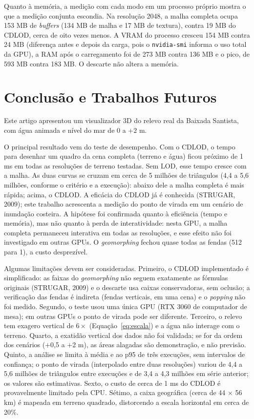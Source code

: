 \documentclass[conference]{IEEEtran}
\begin{document}
Quanto à memória, a medição com cada modo em um processo próprio mostra o que a medição conjunta escondia. Na resolução 2048, a malha completa ocupa 153 MB de \emph{buffers} (134 MB de malha e 17 MB de textura), contra 19 MB do CDLOD, cerca de oito vezes menos. A VRAM do processo cresceu 154 MB contra 24 MB (diferença antes e depois da carga, pois o \texttt{nvidia-smi} informa o uso total da GPU), a RAM após o carregamento foi de 273 MB contra 136 MB e o pico, de 593 MB contra 183 MB. O descarte não altera a memória.

\section{Conclusão e Trabalhos Futuros}
\label{sec:conclusao}

Este artigo apresentou um visualizador 3D do relevo real da Baixada
Santista, com água animada e nível do mar de 0 a $+2$ m.

O principal resultado vem do teste de desempenho. Com o CDLOD, o tempo para
desenhar um quadro da cena completa (terreno e água) ficou próximo de 1 ms
em todas as resoluções de terreno testadas. Sem LOD, esse tempo cresce com a malha. As duas curvas se cruzam em cerca de 5 milhões de triângulos (4,4 a 5,6 milhões, conforme o critério e a execução): abaixo dele a malha completa é mais rápida; acima, o CDLOD. A eficácia do CDLOD já é conhecida (STRUGAR,
2009); este trabalho acrescenta a medição do ponto de virada em um cenário de inundação costeira. A hipótese foi confirmada quanto à eficiência (tempo e memória), mas não quanto à perda de interatividade: nesta GPU, a malha completa permaneceu interativa em todas as resoluções, e esse efeito não foi investigado em outras GPUs. O \emph{geomorphing} fechou quase todas as fendas (512 para 1), a custo desprezível.

Algumas limitações devem ser consideradas. Primeiro, o CDLOD implementado é simplificado: as faixas do \emph{geomorphing} não seguem exatamente as fórmulas originais (STRUGAR, 2009) e o descarte usa caixas conservadoras, sem oclusão; a verificação das fendas é indireta (fendas verticais, em uma cena) e o \emph{popping} não foi medido. Segundo, o teste usou uma única GPU (RTX 3060 de computador de mesa); em outras GPUs o ponto de virada pode ser diferente. Terceiro, o relevo tem exagero vertical de $6\times$ (Equação~\eqref{eq:escala}) e a água não interage com o terreno. Quarto, a exatidão vertical dos dados não foi validada; se for da ordem dos cenários (+0,5 a +2 m), as áreas alagadas são demonstração, e não previsão. Quinto, a análise se limita à média e ao p95 de três execuções, sem intervalos de confiança; o ponto de virada (interpolado entre duas resoluções) variou de 4,4 a 5,6 milhões de triângulos entre execuções e de 3,4 a 4,3 milhões em série anterior; os valores são estimativas. Sexto, o custo de cerca de 1 ms do CDLOD é provavelmente limitado pela CPU. Sétimo, a caixa geográfica (cerca de 44 $\times$ 56 km) é mapeada em terreno quadrado, distorcendo a escala horizontal em cerca de 20\%.
\end{document}
